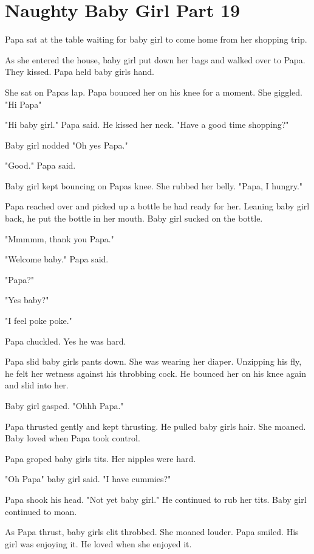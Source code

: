 \section{Naughty Baby Girl Part 19}

     Papa sat at the table waiting for baby girl to come home from her shopping trip.

    As she entered the house, baby girl put down her bags and walked over to Papa. They kissed. Papa held baby girls hand. 

     She sat on Papas lap. Papa bounced her on his knee for a moment. She giggled. "Hi Papa"

    "Hi baby girl." Papa said. He kissed her neck. "Have a good time shopping?"

     Baby girl nodded "Oh yes Papa."

     "Good." Papa said. 

     Baby girl kept bouncing on Papas knee. She rubbed her belly. "Papa, I hungry."

     Papa reached over and picked up a bottle he had ready for her. Leaning baby girl back, he put the bottle in her mouth. Baby girl sucked on the bottle. 

     "Mmmmm, thank you Papa."

     "Welcome baby." Papa said.

     "Papa?"

     "Yes baby?"

     "I feel poke poke."

     Papa chuckled. Yes he was hard.

     Papa slid baby girls pants down. She was wearing her diaper. Unzipping his fly, he felt her wetness against his throbbing cock. He bounced her on his knee again and slid into her. 

     Baby girl gasped. "Ohhh Papa."

     Papa thrusted gently and kept thrusting. He pulled baby girls hair. She moaned. Baby loved when Papa took control.

     Papa groped baby girls tits. Her nipples were hard.

     "Oh Papa" baby girl said. "I have cummies?"

     Papa shook his head. "Not yet baby girl." He continued to rub her tits. Baby girl continued to moan.

     As Papa thrust, baby girls clit throbbed. She moaned louder. Papa smiled. His girl was enjoying it. He loved when she enjoyed it.


